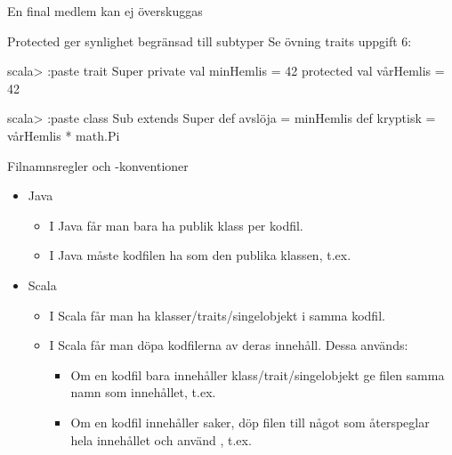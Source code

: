 \begin{Slide}{En final medlem kan ej överskuggas}
\vspace{-0.5em}
\end{Slide}


\begin{Slide}{Protected ger synlighet begränsad till subtyper}
Se övning traits uppgift 6:
\begin{REPL}
scala> :paste
trait Super { 
  private val minHemlis = 42
  protected val vårHemlis = 42
}

scala> :paste
class Sub extends Super { 
  def avslöja = minHemlis
  def kryptisk = vårHemlis * math.Pi
} 
\end{REPL}
\end{Slide}


\begin{Slide}{Filnamnsregler och -konventioner}
\begin{itemize}
\item Java
\begin{itemize}
\item I Java får man bara ha  publik klass per kodfil.
\item I Java måste kodfilen ha  som den publika klassen, t.ex. 
\end{itemize}
\item Scala
\begin{itemize}
\item I Scala får man ha  klasser/traits/singelobjekt i samma kodfil.
\item I Scala får man döpa kodfilerna  av deras innehåll. \pause Dessa  används:
\begin{itemize}
\item Om en kodfil bara innehåller  klass/trait/singelobjekt ge filen samma namn som innehållet, t.ex.  
\item Om en kodfil innehåller  saker, döp filen till något som återspeglar hela innehållet och använd , t.ex. 
\end{itemize}


\end{itemize}

\end{itemize}
\end{Slide}





